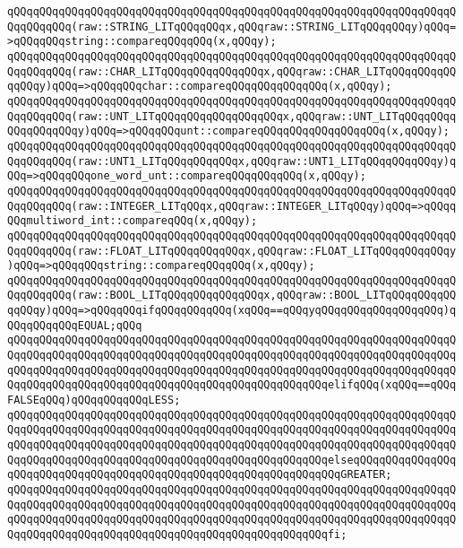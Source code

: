 \verb|qQQqqQQqqQQqqQQqqQQqqQQqqQQqqQQqqQQqqQQqqQQqqQQqqQQqqQQqqQQqqQQqqQQqqQQqqQQqqQQq(raw::STRING_LITqQQqqQQqx,qQQqraw::STRING_LITqQQqqQQqy)qQQq=>qQQqqQQqstring::compareqQQqqQQq(x,qQQqy);|\newline
\verb|qQQqqQQqqQQqqQQqqQQqqQQqqQQqqQQqqQQqqQQqqQQqqQQqqQQqqQQqqQQqqQQqqQQqqQQqqQQqqQQq(raw::CHAR_LITqQQqqQQqqQQqqQQqx,qQQqraw::CHAR_LITqQQqqQQqqQQqqQQqy)qQQq=>qQQqqQQqchar::compareqQQqqQQqqQQqqQQq(x,qQQqy);|\newline
\verb|qQQqqQQqqQQqqQQqqQQqqQQqqQQqqQQqqQQqqQQqqQQqqQQqqQQqqQQqqQQqqQQqqQQqqQQqqQQqqQQq(raw::UNT_LITqQQqqQQqqQQqqQQqqQQqx,qQQqraw::UNT_LITqQQqqQQqqQQqqQQqqQQqy)qQQq=>qQQqqQQqunt::compareqQQqqQQqqQQqqQQqqQQq(x,qQQqy);|\newline
\verb|qQQqqQQqqQQqqQQqqQQqqQQqqQQqqQQqqQQqqQQqqQQqqQQqqQQqqQQqqQQqqQQqqQQqqQQqqQQqqQQq(raw::UNT1_LITqQQqqQQqqQQqx,qQQqraw::UNT1_LITqQQqqQQqqQQqy)qQQq=>qQQqqQQqone_word_unt::compareqQQqqQQqqQQq(x,qQQqy);|\newline
\verb|qQQqqQQqqQQqqQQqqQQqqQQqqQQqqQQqqQQqqQQqqQQqqQQqqQQqqQQqqQQqqQQqqQQqqQQqqQQqqQQq(raw::INTEGER_LITqQQqx,qQQqraw::INTEGER_LITqQQqy)qQQq=>qQQqqQQqmultiword_int::compareqQQq(x,qQQqy);|\newline
\verb|qQQqqQQqqQQqqQQqqQQqqQQqqQQqqQQqqQQqqQQqqQQqqQQqqQQqqQQqqQQqqQQqqQQqqQQqqQQqqQQq(raw::FLOAT_LITqQQqqQQqqQQqx,qQQqraw::FLOAT_LITqQQqqQQqqQQqy)qQQq=>qQQqqQQqstring::compareqQQqqQQq(x,qQQqy);|\newline
\verb|qQQqqQQqqQQqqQQqqQQqqQQqqQQqqQQqqQQqqQQqqQQqqQQqqQQqqQQqqQQqqQQqqQQqqQQqqQQqqQQq(raw::BOOL_LITqQQqqQQqqQQqqQQqx,qQQqraw::BOOL_LITqQQqqQQqqQQqqQQqy)qQQq=>qQQqqQQqifqQQqqQQqqQQq(xqQQq==qQQqyqQQqqQQqqQQqqQQqqQQq)qQQqqQQqqQQqEQUAL;qQQq|\newline
\verb|qQQqqQQqqQQqqQQqqQQqqQQqqQQqqQQqqQQqqQQqqQQqqQQqqQQqqQQqqQQqqQQqqQQqqQQqqQQqqQQqqQQqqQQqqQQqqQQqqQQqqQQqqQQqqQQqqQQqqQQqqQQqqQQqqQQqqQQqqQQqqQQqqQQqqQQqqQQqqQQqqQQqqQQqqQQqqQQqqQQqqQQqqQQqqQQqqQQqqQQqqQQqqQQqqQQqqQQqqQQqqQQqqQQqqQQqqQQqqQQqqQQqqQQqqQQqqQQqqQQqelifqQQq(xqQQq==qQQqFALSEqQQq)qQQqqQQqqQQqLESS;|\newline
\verb|qQQqqQQqqQQqqQQqqQQqqQQqqQQqqQQqqQQqqQQqqQQqqQQqqQQqqQQqqQQqqQQqqQQqqQQqqQQqqQQqqQQqqQQqqQQqqQQqqQQqqQQqqQQqqQQqqQQqqQQqqQQqqQQqqQQqqQQqqQQqqQQqqQQqqQQqqQQqqQQqqQQqqQQqqQQqqQQqqQQqqQQqqQQqqQQqqQQqqQQqqQQqqQQqqQQqqQQqqQQqqQQqqQQqqQQqqQQqqQQqqQQqqQQqqQQqqQQqqQQqelseqQQqqQQqqQQqqQQqqQQqqQQqqQQqqQQqqQQqqQQqqQQqqQQqqQQqqQQqqQQqqQQqqQQqGREATER;|\newline
\verb|qQQqqQQqqQQqqQQqqQQqqQQqqQQqqQQqqQQqqQQqqQQqqQQqqQQqqQQqqQQqqQQqqQQqqQQqqQQqqQQqqQQqqQQqqQQqqQQqqQQqqQQqqQQqqQQqqQQqqQQqqQQqqQQqqQQqqQQqqQQqqQQqqQQqqQQqqQQqqQQqqQQqqQQqqQQqqQQqqQQqqQQqqQQqqQQqqQQqqQQqqQQqqQQqqQQqqQQqqQQqqQQqqQQqqQQqqQQqqQQqqQQqqQQqqQQqqQQqqQQqfi;|\newline
